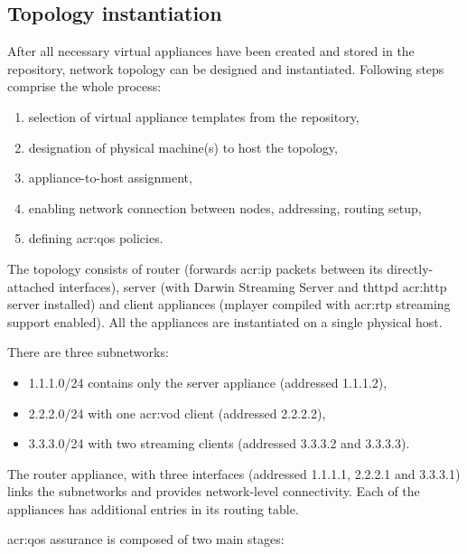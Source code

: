 \documentclass[11pt]{book}
\begin{document}
      \subsection{Topology instantiation}
      \label{ssub:}

        After all necessary virtual appliances have been created and stored in the repository, network topology can be
        designed and instantiated. Following steps comprise the whole process:

        \begin{enumerate}
          \item selection of virtual appliance templates from the repository,
          \item designation of physical machine(s) to host the topology,
          \item appliance-to-host assignment,
          \item enabling network connection between nodes, addressing, routing setup,
          \item defining \gls{acr:qos} policies.
        \end{enumerate}

        The topology consists of router (forwards \gls{acr:ip} packets between its directly-attached interfaces), server
        (with Darwin Streaming Server and thttpd \gls{acr:http} server installed) and client appliances (mplayer
        compiled with \gls{acr:rtp} streaming support enabled). All the appliances are instantiated on a single physical
        host.

        There are three subnetworks:

        \begin{itemize}
          \item 1.1.1.0/24 contains only the server appliance (addressed 1.1.1.2),
          \item 2.2.2.0/24 with one \gls{acr:vod} client (addressed 2.2.2.2),
          \item 3.3.3.0/24 with two streaming clients (addressed 3.3.3.2 and 3.3.3.3).
        \end{itemize}

        The router appliance, with three interfaces (addressed 1.1.1.1, 2.2.2.1 and 3.3.3.1) links the subnetworks and
        provides network-level connectivity. Each of the appliances has additional entries in its routing table.

        \gls{acr:qos} assurance is composed of two main stages:
\end{document}
